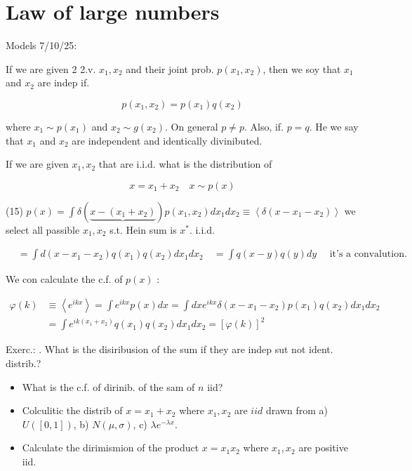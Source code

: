 \section{Law of large numbers}
Models 7/10/25:

If we are given 2 2.v. $x_{1}, x_{2}$ and their joint prob. $p\left(x_{1}, x_{2}\right)$, then we soy that $x_{1}$ and $x_{2}$ are indep if.

$$ p\left(x_{1}, x_{2}\right)=p\left(x_{1}\right) q\left(x_{2}\right) $$ 

where $x_{1} \sim p\left(x_{1}\right)$ and $x_{2} \sim g\left(x_{2}\right)$. On general $p \neq p$.
Also, if. $p=q$. He we say that $x_{1}$ and $x_{2}$ are independent and identically divinibuted.

If we are given $x_{1}, x_{2}$ that are i.i.d. what is the distribution of

$$ x=x_{1}+x_{2} \quad x \sim p(x) $$ 

(15) $p(x)=\int \delta(\underbrace{x-\left(x_{1}+x_{2}\right)}) p\left(x_{1}, x_{2}\right) d x_{1} d x_{2} \equiv\left\langle\delta\left(x-x_{1}-x_{2}\right)\right\rangle$ we select all passible $x_{1}, x_{2}$ s.t. Hein sum is $x^{*}$.
i.i.d.

$$ \begin{aligned} & =\int d\left(x-x_{1}-x_{2}\right) q\left(x_{1}\right) q\left(x_{2}\right) d x_{1} d x_{2} \ & =\int q(x-y) q(y) d y \quad \text { it's a convalution. } \ \end{aligned} $$ 

We con calculate the c.f. of $p(x)$ :

\begin{align*}
\varphi(k) & \equiv\left\langle e^{i k x}\right\rangle=\int e^{i k x} p(x) d x=\int d x e^{i k x} \delta\left(x-x_{1}-x_{2}\right) p\left(x_{1}\right) q\left(x_{2}\right) d x_{1} d x_{2} \\ & =\int e^{i k\left(x_{1}+x_{2}\right)} q\left(x_{1}\right) q\left(x_{2}\right) d x_{1} d x_{2}=[\varphi(k)]^{2} \tag{16}
\end{align*} 

Exerc.: . What is the disiribusion of the sum if they are indep sut not ident. distrib.?

\begin{itemize}
  \item What is the c.f. of dirinib. of the sam of $n$ iid?
  \item Colculitic the distrib of $x=x_{1}+x_{2}$ where $x_{1}, x_{2}$ are $i i d$ drawn from
a) $U([0,1])$,
b) $N(\mu, \sigma)$,
c) $\lambda e^{-\lambda x}$.
  \item Calculate the dirimismion of the product $x=x_{1} x_{2}$ where $x_{1}, x_{2}$ are positive iid.
\end{itemize}

